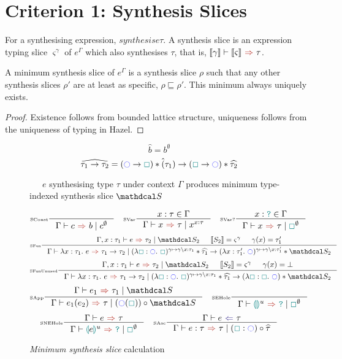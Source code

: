 \section{Criterion 1: Synthesis Slices}
\label{sec:SynthesisSlicesJudgement}
\begin{definition}
For a synthesising expression, $synthesis{e}{\tau}$. A synthesis slice is an expression typing slice $\varsigma^{\gamma}$ of $e^\Gamma$ which also synthesises $\tau$, that is, $\synthesis[\type{\gamma}]{\type{\varsigma}}{\tau}$.
\end{definition}
\begin{proposition}
A minimum synthesis slice of $e^\Gamma$ is a synthesis slice $\rho$ such that any other synthesis slices $\rho'$ are at least as specific, $\rho \sqsubseteq \rho'$. This minimum always uniquely exists.
\end{proposition}
\begin{proof}
Existence follows from bounded lattice structure, uniqueness follows from the uniqueness of typing in Hazel.
\end{proof}
\begin{definition}
\[\widehat{b} = b^\emptyset\]
\[\widehat{\tau_1 \to \tau_2} = (\cmark \to \gap) * \hat(\tau_1) \to (\gap \to \cmark) * \widehat{\tau_2}\]
\end{definition}
\newcommand{\id}{\mathrm{id}}
\begin{figure}[H]
\ \ \ $e$ synthesising type $\tau$ under context $\Gamma$ produces minimum type-indexed synthesis slice $\S$

\[\inference[\tiny SConst]{}{\synthesisslice{c}{b}{c^\emptyset}} \quad
\inference[\tiny SVar]{x : \tau \in \Gamma}{\synthesisslice{x}{\tau}{x^{x:\tau}}} \quad
\inference[\tiny SVar?]{x : \dyn \in \Gamma}{\synthesisslice{x}{\tau}{\gap^\emptyset}}\]
\[\inference[\tiny SFun]{\synthesisslice[\Gamma,x:\tau_1]{e}{\tau_2}{\S_2} & \type{S_2} = \varsigma^\gamma & \gamma(x) = \tau_1'}{\synthesisslice{\lambda x:\tau_1.\ e}{\tau_1 \to \tau_2}{(\lambda \gap : \cmark.\ \gap)^{\gamma \mapsto \gamma\backslash x: \tau_1} * \widehat{\tau_1} \to (\lambda x : \tau_1'.\ \cmark)^{\gamma \mapsto \gamma\backslash x: \tau_1'} * \S_2}}\]
\[\inference[\tiny SFunUnused]{\synthesisslice[\Gamma,x:\tau_1]{e}{\tau_2}{\S_2} & \type{S_2} = \varsigma^\gamma & \gamma(x) = \bot}{\synthesisslice{\lambda x:\tau_1.\ e}{\tau_1 \to \tau_2}{(\lambda \gap : \cmark.\ \gap)^{\gamma \mapsto \gamma\backslash x: \tau_1} * \widehat{\tau_1} \to (\lambda \gap : \gap.\ \cmark) * \S_2}}\]
\[\inference[\tiny SApp]{\synthesisslice{e_1}{\tau_1}{\S}}{\synthesisslice{e_1(e_2)}{\tau}{(\cmark(\gap)) \circ \S}} \quad 
\inference[\tiny SEHole]{}{\synthesisslice{\hole^u}{\dyn}{\gap^\emptyset}}\]
\[\inference[\tiny SNEHole]{\synthesis{e}{\tau}}{\synthesisslice{\hole[e]^u}{\dyn}{\gap^\emptyset}}\quad 
\inference[\tiny SAsc]{\analysis{e}{\tau}}{\synthesisslice{e : \tau}{\tau}{(\gap : \cmark) \circ \widehat{\tau}}}\]

\caption{\textit{Minimum synthesis slice} calculation}
\label{fig:SynthesisSlices}
\end{figure} 


